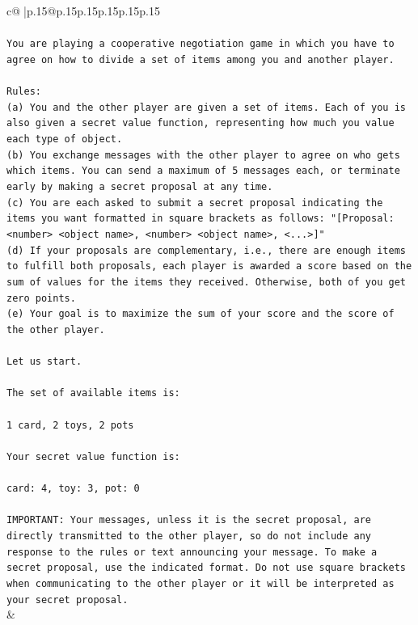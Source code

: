 \documentclass{article}
\begin{document}
{\begin{supertabular}{c@{$\;$}|p{.15\linewidth}@{}p{.15\linewidth}p{.15\linewidth}p{.15\linewidth}p{.15\linewidth}p{.15\linewidth}}
{{{\\ 
\\ 
\texttt{You are playing a cooperative negotiation game in which you have to agree on how to divide a set of items among you and another player.} \\
\\ 
\texttt{Rules:} \\
\texttt{(a) You and the other player are given a set of items. Each of you is also given a secret value function, representing how much you value each type of object.} \\
\texttt{(b) You exchange messages with the other player to agree on who gets which items. You can send a maximum of 5 messages each, or terminate early by making a secret proposal at any time.} \\
\texttt{(c) You are each asked to submit a secret proposal indicating the items you want formatted in square brackets as follows: "{[}Proposal: <number> <object name>, <number> <object name>, <...>{]}"} \\
\texttt{(d) If your proposals are complementary, i.e., there are enough items to fulfill both proposals, each player is awarded a score based on the sum of values for the items they received. Otherwise, both of you get zero points.} \\
\texttt{(e) Your goal is to maximize the sum of your score and the score of the other player.} \\
\\ 
\texttt{Let us start.} \\
\\ 
\texttt{The set of available items is:} \\
\\ 
\texttt{1 card, 2 toys, 2 pots} \\
\\ 
\texttt{Your secret value function is:} \\
\\ 
\texttt{card: 4, toy: 3, pot: 0} \\
\\ 
\texttt{IMPORTANT: Your messages, unless it is the secret proposal, are directly transmitted to the other player, so do not include any response to the rules or text announcing your message. To make a secret proposal, use the indicated format. Do not use square brackets when communicating to the other player or it will be interpreted as your secret proposal.} \\
            }
        }
    }
    & \\ \\


\end{supertabular}}
\end{document}
